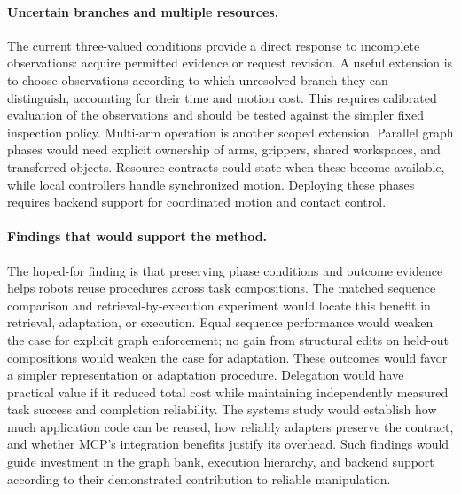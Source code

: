 \documentclass[10pt,twocolumn,letterpaper]{article}
\begin{document}
\paragraph{Uncertain branches and multiple resources.}
The current three-valued conditions provide a direct response to incomplete observations: acquire permitted evidence or request revision. A useful extension is to choose observations according to which unresolved branch they can distinguish, accounting for their time and motion cost. This requires calibrated evaluation of the observations and should be tested against the simpler fixed inspection policy. Multi-arm operation is another scoped extension. Parallel graph phases would need explicit ownership of arms, grippers, shared workspaces, and transferred objects. Resource contracts could state when these become available, while local controllers handle synchronized motion. Deploying these phases requires backend support for coordinated motion and contact control.

\paragraph{Findings that would support the method.}
The hoped-for finding is that preserving phase conditions and outcome evidence helps robots reuse procedures across task compositions. The matched sequence comparison and retrieval-by-execution experiment would locate this benefit in retrieval, adaptation, or execution. Equal sequence performance would weaken the case for explicit graph enforcement; no gain from structural edits on held-out compositions would weaken the case for adaptation. These outcomes would favor a simpler representation or adaptation procedure. Delegation would have practical value if it reduced total cost while maintaining independently measured task success and completion reliability. The systems study would establish how much application code can be reused, how reliably adapters preserve the contract, and whether MCP's integration benefits justify its overhead. Such findings would guide investment in the graph bank, execution hierarchy, and backend support according to their demonstrated contribution to reliable manipulation.

\end{document}
